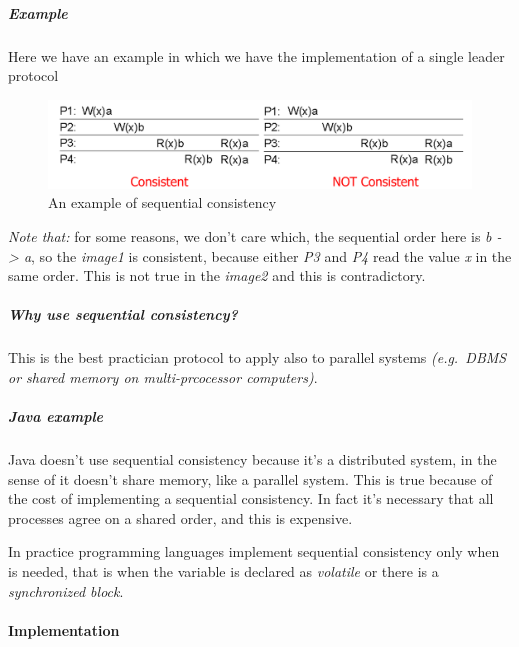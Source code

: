 \subparagraph{\emph{Example}}\label{example}

Here we have an example in which we have the implementation of a single
leader protocol

\begin{figure}[htbp]
\centering
\includegraphics[width=\textwidth]{src/images/consistency-replication/sequential.png}
\caption{An example of sequential consistency}
\end{figure}

\emph{Note that:} for some reasons, we don't care which, the sequential
order here is \emph{b -\textgreater{} a}, so the \emph{image1} is
consistent, because either \emph{P3} and \emph{P4} read the value
\emph{x} in the same order. This is not true in the \emph{image2} and
this is contradictory.

\subparagraph{Why use sequential
consistency?}\label{why-use-sequential-consistency}

This is the best practician protocol to apply also to parallel systems
\emph{(e.g.~DBMS or shared memory on multi-prcocessor computers)}.

\subparagraph{\emph{Java example}}\label{java-example}

Java doesn't use sequential consistency because it's a distributed
system, in the sense of it doesn't share memory, like a parallel system.
This is true because of the cost of implementing a sequential
consistency. In fact it's necessary that all processes agree on a shared
order, and this is expensive.

In practice programming languages implement sequential consistency only
when is needed, that is when the variable is declared as \emph{volatile}
or there is a \emph{synchronized block}.\\
\paragraph{Implementation}

